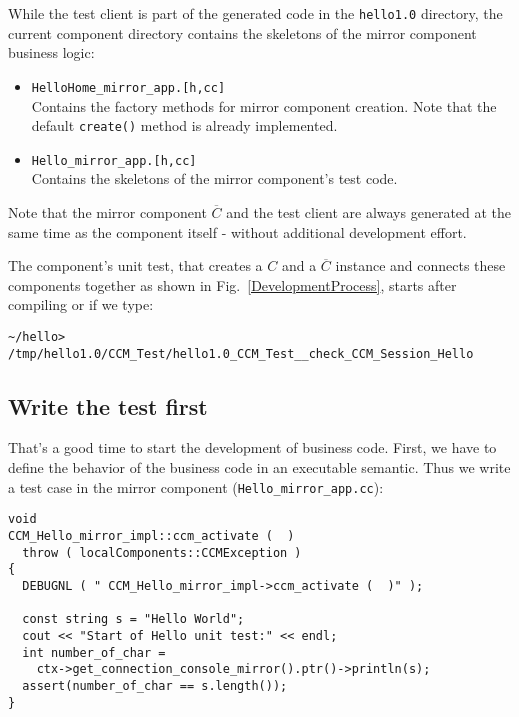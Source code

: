 While the test client is part of the generated code in the {\tt hello1.0} directory,
the current component directory contains the skeletons of the mirror component business
logic:
\begin{itemize}
\item {\tt HelloHome\_mirror\_app.[h,cc]} \\
Contains the factory methods for mirror component creation.
Note that the default {\tt create()} method is already implemented.
\item {\tt Hello\_mirror\_app.[h,cc]} \\
Contains the skeletons of the mirror component's test code.
\end{itemize}

\noindent
Note that the mirror component $\overline{C}$ and the test client are always generated 
at the same time as the component itself - without additional development effort.

\noindent
The component's unit test, that creates a $C$ and a 
$\overline{C}$ instance and connects these components together as shown in 
Fig.~\ref{DevelopmentProcess}, starts after compiling or if we type:
\begin{small}
\begin{verbatim}
~/hello> /tmp/hello1.0/CCM_Test/hello1.0_CCM_Test__check_CCM_Session_Hello
\end{verbatim}
\end{small} 



\subsection{Write the test first}

That's a good time to start the development of business code.
First, we have to define the behavior of the business code in an executable
semantic.
Thus we write a test case in the mirror component ({\tt Hello\_mirror\_app.cc}):
\begin{verbatim}
void
CCM_Hello_mirror_impl::ccm_activate (  )
  throw ( localComponents::CCMException )
{
  DEBUGNL ( " CCM_Hello_mirror_impl->ccm_activate (  )" );

  const string s = "Hello World";
  cout << "Start of Hello unit test:" << endl;
  int number_of_char =
    ctx->get_connection_console_mirror().ptr()->println(s);
  assert(number_of_char == s.length());	
}
\end{verbatim}

